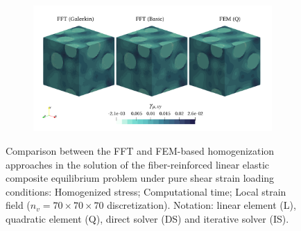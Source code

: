 \begin{figure}[hbt]
\begin{subfigure}[b]{0.49\textwidth}
    \caption{}
    \label{subfig:linear_3D_shear_cpu_time_vs_n_voxels}
  \end{subfigure}
  \begin{subfigure}[b]{\textwidth}
    \centering
    \includegraphics[width=\textwidth]{figures/linear_3D_shear_strain_12}
    \caption{}
    \label{subfig:linear_3D_shear_strain_12}
  \end{subfigure}
  \caption{Comparison between the FFT and FEM-based homogenization approaches in the
  solution of the fiber-reinforced linear elastic composite equilibrium problem under pure shear
  strain loading conditions:  Homogenized stress;  Computational time;  Local strain field
  (\(n_v = 70 \times 70 \times 70\) discretization). Notation: linear element (L), quadratic element (Q), direct solver
  (DS) and iterative solver (IS).}
  \label{fig:linear_3D_shear}
\end{figure}

